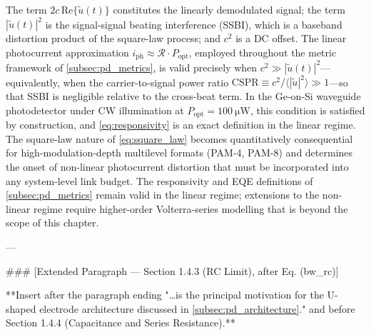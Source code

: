 The term $2c\,\mathrm{Re}\{\tilde{u}(t)\}$ constitutes the linearly demodulated signal; the term $|\tilde{u}(t)|^2$ is the signal-signal beating interference (SSBI), which is a baseband distortion product of the square-law process; and $c^2$ is a DC offset. The linear photocurrent approximation $i_\mathrm{ph} \approx \mathcal{R}\cdot P_\mathrm{opt}$, employed throughout the metric framework of \cref{subsec:pd_metrics}, is valid precisely when $c^2 \gg |\tilde{u}(t)|^2$—equivalently, when the carrier-to-signal power ratio $\mathrm{CSPR} \equiv c^2/\langle|\tilde{u}|^2\rangle \gg 1$—so that SSBI is negligible relative to the cross-beat term. In the Ge-on-Si waveguide photodetector under CW illumination at $P_\mathrm{opt} = \SI{100}{\micro\watt}$, this condition is satisfied by construction, and \cref{eq:responsivity} is an exact definition in the linear regime. The square-law nature of \cref{eq:square_law} becomes quantitatively consequential for high-modulation-depth multilevel formats (PAM-4, PAM-8) and determines the onset of non-linear photocurrent distortion that must be incorporated into any system-level link budget. The responsivity and EQE definitions of \cref{subsec:pd_metrics} remain valid in the linear regime; extensions to the non-linear regime require higher-order Volterra-series modelling that is beyond the scope of this chapter.

---

### [Extended Paragraph — Section 1.4.3 (RC Limit), after Eq. (bw\_rc)]

**Insert after the paragraph ending "…is the principal motivation for the U-shaped electrode architecture discussed in \cref{subsec:pd_architecture}." and before Section 1.4.4 (Capacitance and Series Resistance).**

